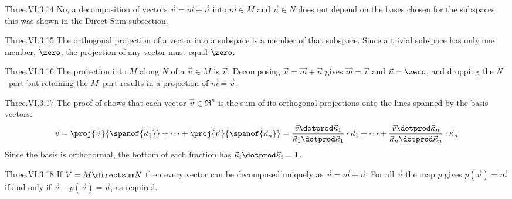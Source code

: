 \begin{ans}{Three.VI.3.14}
      No, a decomposition of vectors $\vec{v}=\vec{m}+\vec{n}$ into
      $\vec{m}\in M$ and $\vec{n}\in N$ does not depend on the bases
      chosen for the subspaces\Dash
      this was shown in the Direct Sum subsection.
    
\end{ans}
\begin{ans}{Three.VI.3.15}
      The orthogonal projection of a vector into a subspace is a member of
      that subspace.
      Since a trivial subspace has only one member, $\zero$, the projection of
      any vector must equal $\zero$.
    
\end{ans}
\begin{ans}{Three.VI.3.16}
      The projection into $M$ along
      $N$ of a $\vec{v}\in M$ is $\vec{v}$.
      Decomposing
      $\vec{v}=\vec{m}+\vec{n}$ gives $\vec{m}=\vec{v}$ and $\vec{n}=\zero$,
      and dropping the $N$~part but retaining the $M$~part results in a
      projection of $\vec{m}=\vec{v}$.
    
\end{ans}
\begin{ans}{Three.VI.3.17}
      The proof of  shows that
      each vector $\vec{v}\in\Re^n$
      is the sum of its orthogonal projections
      onto the lines spanned by the basis vectors.
      \begin{equation*}
        \vec{v}=\proj{\vec{v}\,}{\spanof{\vec{\kappa}_1}}
                 +\dots+\proj{\vec{v}\,}{\spanof{\vec{\kappa}_n}}
               =\frac{\vec{v}\dotprod\vec{\kappa}_1}{
                      \vec{\kappa}_1\dotprod\vec{\kappa}_1}
                   \cdot\vec{\kappa}_1
               +\dots
               +\frac{\vec{v}\dotprod\vec{\kappa}_n}{
                      \vec{\kappa}_n\dotprod\vec{\kappa}_n}
                   \cdot\vec{\kappa}_n
      \end{equation*}
      Since the basis is orthonormal, the bottom of each fraction has
      $\vec{\kappa}_i\dotprod\vec{\kappa}_i=1$.
    
\end{ans}
\begin{ans}{Three.VI.3.18}
       If $V=M\directsum N$ then every vector can be decomposed uniquely as
       $\vec{v}=\vec{m}+\vec{n}$.
       For all $\vec{v}$ the map $p$ gives $p(\vec{v})=\vec{m}$ if and only
       if $\vec{v}-p(\vec{v})=\vec{n}$, as required.
     
\end{ans}
